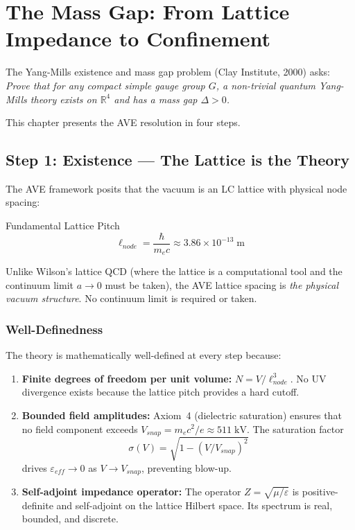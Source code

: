 
\chapter{The Mass Gap: From Lattice Impedance to Confinement}
\label{ch:mass_gap}

The Yang-Mills existence and mass gap problem (Clay Institute, 2000)
asks: \textit{Prove that for any compact simple gauge group $G$, a
non-trivial quantum Yang-Mills theory exists on $\mathbb{R}^4$ and
has a mass gap $\Delta > 0$.}

This chapter presents the AVE resolution in four steps.

\section{Step 1: Existence --- The Lattice is the Theory}
\label{sec:mass_gap_existence}

The AVE framework posits that the vacuum is an LC lattice with physical
node spacing:
\begin{resultbox}{Fundamental Lattice Pitch}
\begin{equation}
    \ell_{node} = \frac{\hbar}{m_e c} \approx 3.86 \times 10^{-13}\;\text{m}
    \label{eq:lattice_pitch}
\end{equation}
\end{resultbox}
Unlike Wilson's lattice QCD (where the lattice is a computational tool
and the continuum limit $a \to 0$ must be taken), the AVE lattice spacing
is \textit{the physical vacuum structure}.  No continuum limit is required
or taken.

\subsection{Well-Definedness}

The theory is mathematically well-defined at every step because:
\begin{enumerate}
    \item \textbf{Finite degrees of freedom per unit volume:}
    $N = V / \ell_{node}^3$.  No UV divergence exists because the
    lattice pitch provides a hard cutoff.
    \item \textbf{Bounded field amplitudes:}  Axiom~4 (dielectric
    saturation) ensures that no field component exceeds
    $V_{snap} = m_e c^2 / e \approx 511\;\text{kV}$.  The saturation
    factor
    \begin{equation}
        \sigma(V) = \sqrt{1 - (V/V_{snap})^2}
    \end{equation}
    drives $\varepsilon_{eff} \to 0$ as $V \to V_{snap}$, preventing
    blow-up.
    \item \textbf{Self-adjoint impedance operator:}  The operator
    $Z = \sqrt{\mu/\varepsilon}$ is positive-definite and self-adjoint
    on the lattice Hilbert space.  Its spectrum is real, bounded, and
    discrete.
\end{enumerate}


